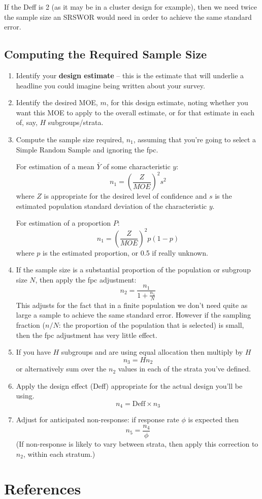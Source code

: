 \documentclass[
]{book}
\begin{document}
If the Deff is 2 (as it may be in a cluster design for example), then we need twice
the sample size an SRSWOR would need in order to achieve the same standard error.

\section{Computing the Required Sample Size}\label{computing-the-required-sample-size}

\begin{enumerate}
\def\labelenumi{\arabic{enumi}.}
\item
  Identify your \textbf{design estimate} -- this is the estimate that will
  underlie a headline you could imagine being written about your survey.
\item
  Identify the desired MOE, \(m\), for this design estimate, noting whether
  you want this MOE to apply to the overall estimate, or for that estimate in
  each of, say, \(H\) subgroups/strata.
\item
  Compute the sample size required, \(n_1\), assuming that you're going to select a
  Simple Random Sample and ignoring the fpc.

  For estimation of a mean \(\bar{Y}\) of some characteristic \(y\):
  \[
   n_1 = \left(\frac{Z}{MOE}\right)^2 s^2
  \]
  where \(Z\) is appropriate for the desired level of confidence and \(s\) is the
  estimated population standard deviation of the characteristic \(y\).

  For estimation of a proportion \(P\):
  \[
   n_1 = \left(\frac{Z}{MOE}\right)^2 p(1-p)
  \]
  where \(p\) is the estimated proportion, or 0.5 if really unknown.
\item
  If the sample size is a substantial proportion of the population or
  subgroup size \(N\), then apply the fpc adjustment:
  \[
     n_2 = \frac{n_1}{1+\frac{n_1}{N}}
  \]
  This adjusts for the fact that in a finite population we don't need
  quite as large a sample to achieve the same standard error. However
  if the sampling fraction (\(n/N\): the proportion of the population that
  is selected) is small, then the fpc adjustment has very little effect.
\item
  If you have \(H\) subgroups and are using equal allocation then multiply by \(H\)
  \[
     n_3 = Hn_2
  \]
  or alternatively sum over the \(n_2\) values in each of the strata you've
  defined.
\item
  Apply the design effect (Deff) appropriate for the actual design you'll
  be using.
  \[
     n_4 = \text{Deff}\times n_3
  \]
\item
  Adjust for anticipated non-response: if response rate \(\phi\) is expected
  then
  \[
     n_5 = \frac{n_4}{\phi}
  \]
  (If non-response is likely to vary between strata, then apply this correction
  to \(n_2\), within each stratum.)
\end{enumerate}

\chapter*{References}\label{references}


\end{document}

